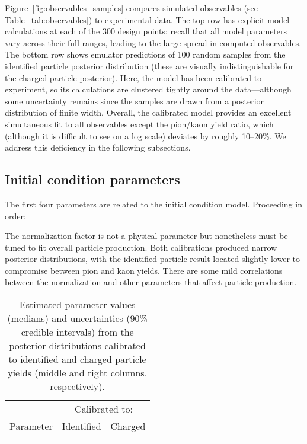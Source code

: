 \documentclass[aps,prc,reprint,amsmath,nofootinbib,superscriptaddress]{revtex4-1}
\newcommand{\paddedhline}{\noalign{\smallskip}\hline\noalign{\smallskip}}
\begin{document}
Figure~\ref{fig:observables_samples} compares simulated observables (see Table~\ref{tab:observables}) to experimental data.
The top row has explicit model calculations at each of the 300 design points;
recall that all model parameters vary across their full ranges, leading to the large spread in computed observables.
The bottom row shows emulator predictions of 100 random samples from the identified particle posterior distribution (these are visually indistinguishable for the charged particle posterior).
Here, the model has been calibrated to experiment, so its calculations are clustered tightly around the data---although some uncertainty remains since the samples are drawn from a posterior distribution of finite width.
Overall, the calibrated model provides an excellent simultaneous fit to all observables except the pion/kaon yield ratio, which (although it is difficult to see on a log scale) deviates by roughly 10--20\%.
We address this deficiency in the following subsections.


\subsection{Initial condition parameters}

The first four parameters are related to the initial condition model.
Proceeding in order:

The normalization factor is not a physical parameter but nonetheless must be tuned to fit overall particle production.
Both calibrations produced narrow posterior distributions, with the identified particle result located slightly lower to compromise between pion and kaon yields.
There are some mild correlations between the normalization and other parameters that affect particle production.

\begin{table}
  \caption{
    \label{tab:posterior}
    Estimated parameter values (medians) and uncertainties (90\% credible intervals) from the posterior distributions calibrated to identified and charged particle yields (middle and right columns, respectively).
  }
  \begin{ruledtabular}
    \begin{tabular}{lll}
      & \multicolumn{2}{c}{Calibrated to:} \\
      \noalign{\smallskip}\cline{2-3}\noalign{\smallskip}
      Parameter & \multicolumn{1}{c}{Identified} & \multicolumn{1}{c}{Charged} \\
      \paddedhline
      
    \end{tabular}
  \end{ruledtabular}
\end{table}
\end{document}
